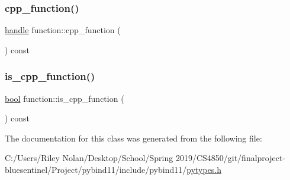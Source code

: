 \subsubsection{\texorpdfstring{cpp\_function()}{cpp\_function()}}
{\footnotesize\ttfamily \mbox{\hyperlink{classhandle}{handle}} function\+::cpp\+\_\+function (\begin{DoxyParamCaption}{ }\end{DoxyParamCaption}) const\hspace{0.3cm}{\ttfamily [inline]}}

\mbox{\label{classfunction_accf0840a607c586ac159024928b98c49}} 
\subsubsection{\texorpdfstring{is\_cpp\_function()}{is\_cpp\_function()}}
{\footnotesize\ttfamily \mbox{\hyperlink{asdl_8h_af6a258d8f3ee5206d682d799316314b1}{bool}} function\+::is\+\_\+cpp\+\_\+function (\begin{DoxyParamCaption}{ }\end{DoxyParamCaption}) const\hspace{0.3cm}{\ttfamily [inline]}}



The documentation for this class was generated from the following file\+:\begin{DoxyCompactItemize}
\item 
C\+:/\+Users/\+Riley Nolan/\+Desktop/\+School/\+Spring 2019/\+C\+S4850/git/finalproject-\/bluesentinel/\+Project/pybind11/include/pybind11/\mbox{\hyperlink{pytypes_8h}{pytypes.\+h}}\end{DoxyCompactItemize}
